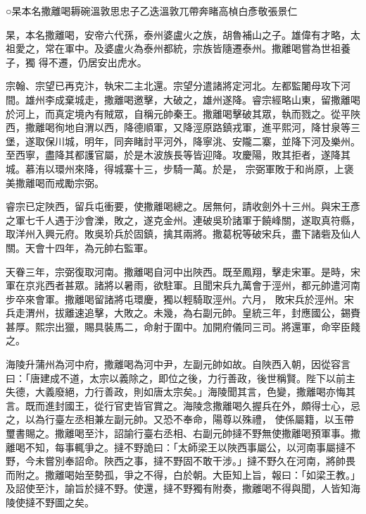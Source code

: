 
\begin{pinyinscope}

 ○杲本名撒離喝耨碗溫敦思忠子乙迭溫敦兀帶奔睹高楨白彥敬張景仁



 杲，本名撒離喝，安帝六代孫，泰州婆盧火之族，胡魯補山之子。雄偉有才略，太祖愛之，常在軍中。及婆盧火為泰州都統，宗族皆隨遷泰州。撒離喝嘗為世祖養子，獨
 得不遷，仍居安出虎水。



 宗翰、宗望已再克汴，執宋二主北還。宗望分遣諸將定河北。左都監闍母攻下河間。雄州李成棄城走，撒離喝邀擊，大破之，雄州遂降。睿宗經略山東，留撒離喝於河上，而真定境內有賊眾，自稱元帥秦王。撒離喝擊破其眾，執而戮之。從平陜西，撒離喝徇地自渭以西，降德順軍，又降涇原路鎮戎軍，進平熙河，降甘泉等三堡，遂取保川城，明年，同奔睹討平河外，降寧洮、安隴二寨，並降下河及樂州。至西寧，盡降其都護官屬，於是木波族長等皆迎降。攻慶陽，敗其拒者，遂降其城。慕洧以環州來降，得城寨十三，步騎一萬。於是，
 宗弼軍敗于和尚原，上褒美撒離喝而戒勵宗弼。



 睿宗已定陜西，留兵屯衝要，使撒離喝總之。居無何，請收劍外十三州。與宋王彥之軍七千人遇于沙會濼，敗之，遂克金州。連破吳玠諸軍于饒峰關，遂取真符縣，取洋州入興元府。敗吳玠兵於固鎮，擒其兩將。撒葛柷等破宋兵，盡下諸砦及仙人關。天會十四年，為元帥右監軍。



 天眷三年，宗弼復取河南。撒離喝自河中出陜西。既至鳳翔，擊走宋軍。是時，宋軍在京兆西者甚眾。諸將以暑雨，欲駐軍。且聞宋兵九萬會于涇州，都元帥遣河南步卒來會軍。撒離喝留諸將屯環慶，獨以輕騎取涇州。六月，
 敗宋兵於涇州。宋兵走渭州，拔離速追擊，大敗之。未幾，為右副元帥。皇統三年，封應國公，錫賚甚厚。熙宗出獵，賜具裝馬二，命射于圍中。加開府儀同三司。將還軍，命宰臣餞之。



 海陵升蒲州為河中府，撒離喝為河中尹，左副元帥如故。自陜西入朝，因從容言曰：「唐建成不道，太宗以義除之，即位之後，力行善政，後世稱賢。陛下以前主失德，大義廢絕，力行善政，則如唐太宗矣。」海陵聞其言，色變，撒離喝亦悔其言。既而進封國王，從行官吏皆官賞之。海陵念撒離喝久握兵在外，頗得士心，忌之，以為行臺左丞相兼左副元帥。又恐不奉命，陽尊以殊禮，
 使係屬籍，以玉帶璽書賜之。撒離喝至汴，詔諭行臺右丞相、右副元帥撻不野無使撒離喝預軍事。撒離喝不知，每事輒爭之。撻不野詭曰：「太師梁王以陜西事屬公，以河南事屬撻不野，今未嘗別奉詔命。陜西之事，撻不野固不敢干涉。」撻不野久在河南，將帥畏而附之。撒離喝始至勢孤，爭之不得，白於朝。大臣知上旨，報曰：「如梁王教。」及詔使至汴，諭旨於撻不野。使還，撻不野獨有附奏，撒離喝不得與聞，人皆知海陵使撻不野圖之矣。




\end{pinyinscope}
